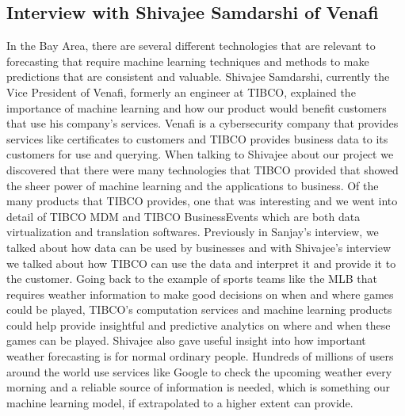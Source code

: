 \documentclass[10pt]{article}
\begin{document}
\subsection*{Interview with Shivajee Samdarshi of Venafi}
In the Bay Area, there are several different technologies that are relevant to forecasting that require machine learning techniques and methods to make predictions that are consistent and valuable. Shivajee Samdarshi, currently the Vice President of Venafi, formerly an engineer at TIBCO, explained the importance of machine learning and how our product would benefit customers that use his company's services. Venafi is a cybersecurity company that provides services like certificates to customers and TIBCO provides business data to its customers for use and querying. When talking to Shivajee about our project we discovered that there were many technologies that TIBCO provided that showed the sheer power of machine learning and the applications to business. Of the many products that TIBCO provides, one that was interesting and we went into detail of TIBCO MDM and TIBCO BusinessEvents which are both data virtualization and translation softwares. Previously in Sanjay’s interview, we talked about how data can be used by businesses and with Shivajee’s interview we talked about how TIBCO can use the data and interpret it and provide it to the customer. Going back to the example of sports teams like the MLB that requires weather information to make good decisions on when and where games could be played, TIBCO’s computation services and machine learning products could help provide insightful and predictive analytics on where and when these games can be played. Shivajee also gave useful insight into how important weather forecasting is for normal ordinary people. Hundreds of millions of users around the world use services like Google to check the upcoming weather every morning and a reliable source of information is needed, which is something our machine learning model, if extrapolated to a higher extent can provide.
\end{document}
